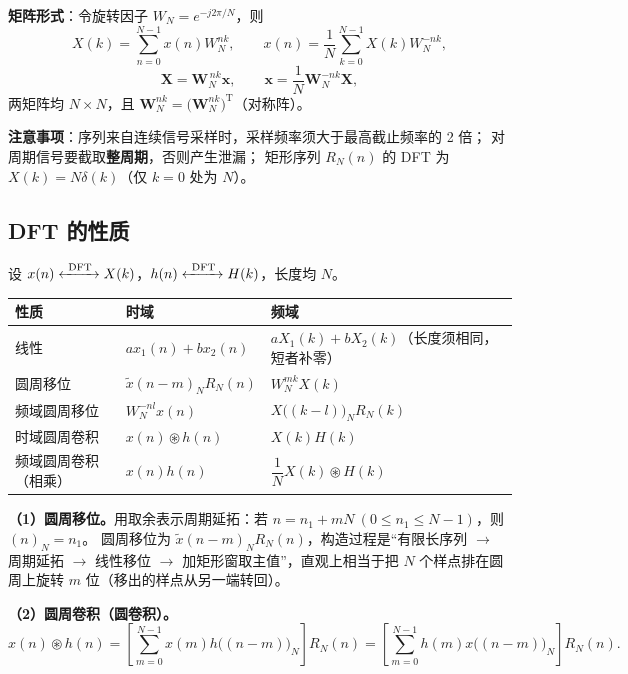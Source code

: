 \textbf{矩阵形式}：令旋转因子 $W_N=e^{-j2\pi/N}$，则
\begin{equation}
X(k)=\sum_{n=0}^{N-1}x(n)W_N^{nk},\qquad
x(n)=\frac{1}{N}\sum_{k=0}^{N-1}X(k)W_N^{-nk},
\end{equation}
\begin{equation}
\mathbf{X}=\mathbf{W}_N^{\,nk}\mathbf{x},\qquad
\mathbf{x}=\frac{1}{N}\mathbf{W}_N^{-nk}\mathbf{X},
\end{equation}
两矩阵均 $N\times N$，且 $\mathbf{W}_N^{nk}=\big(\mathbf{W}_N^{nk}\big)^{\mathrm{T}}$（对称阵）。

\textbf{注意事项}：序列来自连续信号采样时，采样频率须大于最高截止频率的 2 倍；
对周期信号要截取\textbf{整周期}，否则产生泄漏；
矩形序列 $R_N(n)$ 的 DFT 为 $X(k)=N\delta(k)$（仅 $k=0$ 处为 $N$）。

\subsection{DFT 的性质}

设 $x(n)\xleftrightarrow{\ \mathrm{DFT}\ }X(k)$，$h(n)\xleftrightarrow{\ \mathrm{DFT}\ }H(k)$，长度均 $N$。

\begin{center}
\begin{tabular}{lll}
\toprule
性质 & 时域 & 频域 \\
\midrule
线性 & $ax_1(n)+bx_2(n)$ & $aX_1(k)+bX_2(k)$（长度须相同，短者补零） \\
圆周移位 & $\tilde{x}(n-m)_N R_N(n)$ & $W_N^{mk}X(k)$ \\
频域圆周移位 & $W_N^{-nl}x(n)$ & $X\big((k-l)\big)_N R_N(k)$ \\
时域圆周卷积 & $x(n)\circledast h(n)$ & $X(k)H(k)$ \\
频域圆周卷积（相乘） & $x(n)h(n)$ & $\dfrac{1}{N}X(k)\circledast H(k)$ \\
\bottomrule
\end{tabular}
\end{center}

\textbf{（1）圆周移位。}用取余表示周期延拓：若 $n=n_1+mN\ (0\le n_1\le N-1)$，则 $(n)_N=n_1$。
圆周移位为 $\tilde{x}(n-m)_N R_N(n)$，构造过程是“有限长序列 $\to$ 周期延拓 $\to$ 线性移位 $\to$
加矩形窗取主值”，直观上相当于把 $N$ 个样点排在圆周上旋转 $m$ 位（移出的样点从另一端转回）。

\textbf{（2）圆周卷积（圆卷积）。}
\begin{equation}
x(n)\circledast h(n)=\left[\sum_{m=0}^{N-1}x(m)h\big((n-m)\big)_N\right]R_N(n)
=\left[\sum_{m=0}^{N-1}h(m)x\big((n-m)\big)_N\right]R_N(n).
\end{equation}

